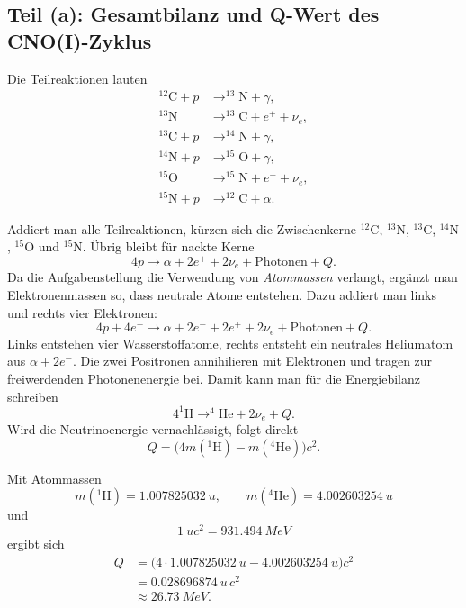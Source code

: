 \documentclass[11pt,a4paper]{scrartcl}
\newcommand{\isotope}[2]{^{#1}\mathrm{#2}}
\theoremstyle{definition}
\theoremstyle{plain}
\theoremstyle{remark}
\begin{document}
\subsection{Teil (a): Gesamtbilanz und Q-Wert des CNO(I)-Zyklus}

Die Teilreaktionen lauten
\begin{align*}
    \isotope{12}{C}+p &\longrightarrow \isotope{13}{N}+\gamma,\\
    \isotope{13}{N} &\longrightarrow \isotope{13}{C}+e^+ + \nu_e,\\
    \isotope{13}{C}+p &\longrightarrow \isotope{14}{N}+\gamma,\\
    \isotope{14}{N}+p &\longrightarrow \isotope{15}{O}+\gamma,\\
    \isotope{15}{O} &\longrightarrow \isotope{15}{N}+e^+ + \nu_e,\\
    \isotope{15}{N}+p &\longrightarrow \isotope{12}{C}+\alpha.
\end{align*}

\begin{calculationbox}[title=Gesamtreaktionsbilanz]
Addiert man alle Teilreaktionen, kürzen sich die Zwischenkerne
\(\isotope{12}{C}\), \(\isotope{13}{N}\), \(\isotope{13}{C}\), \(\isotope{14}{N}\), \(\isotope{15}{O}\) und \(\isotope{15}{N}\). Übrig bleibt für nackte Kerne
\[
    4p \longrightarrow \alpha + 2e^+ + 2\nu_e + \text{Photonen} + Q.
\]
Da die Aufgabenstellung die Verwendung von \emph{Atommassen} verlangt, ergänzt man Elektronenmassen so, dass neutrale Atome entstehen. Dazu addiert man links und rechts vier Elektronen:
\[
    4p + 4e^- \longrightarrow \alpha + 2e^- + 2e^+ + 2\nu_e + \text{Photonen} + Q.
\]
Links entstehen vier Wasserstoffatome, rechts entsteht ein neutrales Heliumatom aus \(\alpha+2e^-\). Die zwei Positronen annihilieren mit Elektronen und tragen zur freiwerdenden Photonenenergie bei. Damit kann man für die Energiebilanz schreiben
\[
    4\isotope{1}{H} \longrightarrow \isotope{4}{He} + 2\nu_e + Q.
\]
Wird die Neutrinoenergie vernachlässigt, folgt direkt
\[
    Q = \bigl(4m(\isotope{1}{H}) - m(\isotope{4}{He})\bigr)c^2.
\]
\end{calculationbox}

\begin{calculationbox}[title=Numerischer Q-Wert]
Mit Atommassen
\[
    m(\isotope{1}{H}) = \SI{1.007825032}{u},
    \qquad
    m(\isotope{4}{He}) = \SI{4.002603254}{u}
\]
und
\[
    \SI{1}{u}c^2 = \SI{931.494}{MeV}
\]
ergibt sich
\begin{align*}
    Q
    &= \bigl(4\cdot \SI{1.007825032}{u}-\SI{4.002603254}{u}\bigr)c^2 \\
    &= \SI{0.028696874}{u}\,c^2 \\
    &\approx \SI{26.73}{MeV}.
\end{align*}
\end{calculationbox}
\end{document}
